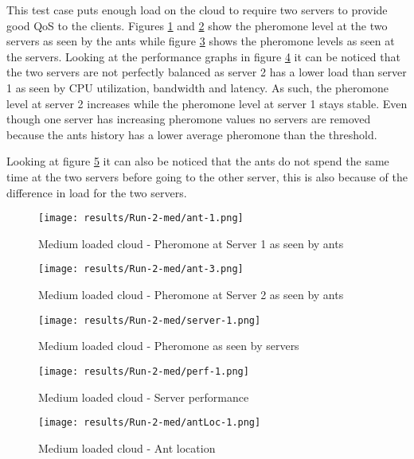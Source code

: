 This test case puts enough load on the cloud to require two servers to provide good QoS to the clients. Figures \ref{fig:2serv-ant1-med} and \ref{fig:2serv-ant3-med} show the pheromone level at the two servers as seen by the ants while figure \ref{fig:2serv-pher-med} shows the pheromone levels as seen at the servers. Looking at the performance graphs in figure \ref{fig:2serv-perf-med} it can be noticed that the two servers are not perfectly balanced as server 2 has a lower load than server 1 as seen by CPU utilization, bandwidth and latency. As such, the pheromone level at server 2 increases while the pheromone level at server 1 stays stable. Even though one server has increasing pheromone values no servers are removed because the ants history has a lower average pheromone than the threshold.

Looking at figure \ref{fig:2serv-antloc-med} it can also be noticed that the ants do not spend the same time at the two servers before going to the other server, this is also because of the difference in load for the two servers.

\begin{figure}[!ht]
	\centering
		\texttt{[image: results/Run-2-med/ant-1.png]}
	\caption{Medium loaded cloud - Pheromone at Server 1 as seen by ants}
	\label{fig:2serv-ant1-med}
\end{figure}

\begin{figure}
	\centering
		\texttt{[image: results/Run-2-med/ant-3.png]}
	\caption{Medium loaded cloud - Pheromone at Server 2 as seen by ants}
	\label{fig:2serv-ant3-med}
\end{figure}

\begin{figure}
	\centering
		\texttt{[image: results/Run-2-med/server-1.png]}
	\caption{Medium loaded cloud - Pheromone as seen by servers}
	\label{fig:2serv-pher-med}
\end{figure}

\begin{figure}
	\centering
		\texttt{[image: results/Run-2-med/perf-1.png]}
	\caption{Medium loaded cloud - Server performance}
	\label{fig:2serv-perf-med}
\end{figure}

\begin{figure}
	\centering
		\texttt{[image: results/Run-2-med/antLoc-1.png]}
	\caption{Medium loaded cloud - Ant location}
	\label{fig:2serv-antloc-med}
\end{figure}

